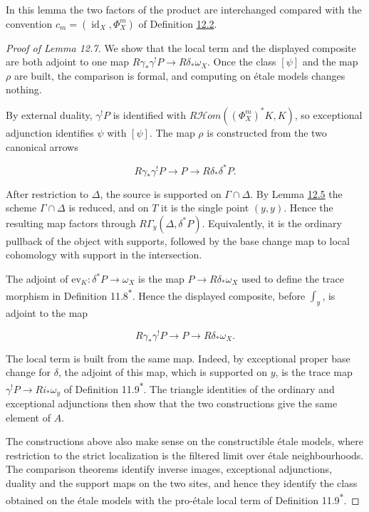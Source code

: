 \documentclass[11pt]{article}
\newcommand{\bpout}[1]{#1\textsuperscript{\hyperlink{bp-outside}{\ensuremath{\ast}}}}
\providecommand{\cHom}{}\renewcommand{\cHom}{R\mathcal{H}\!om}
\begin{document}
\label{bp22}%
In this lemma the two factors of the product are interchanged compared with the convention \(c_m=(\operatorname{id}_X,\Phi_X^m)\) of Definition \hyperref[bp7]{12.2}.

\begin{proof}[{Proof of Lemma 12.7}]\label{bp23}%
We show that the local term and the displayed composite are both adjoint to one map \(R\gamma_*\gamma^!P\to R\delta_*\omega_X\). Once the class \([\psi]\) and the map \(\rho\) are built, the comparison is formal, and computing on étale models changes nothing.

By external duality, \(\gamma^!P\) is identified with \(\cHom((\Phi_X^m)^*K,K)\), so exceptional adjunction identifies \(\psi\) with \([\psi]\). The map \(\rho\) is constructed from the two canonical arrows

\[
R\gamma_*\gamma^!P\longrightarrow P\longrightarrow R\delta_*\delta^*P.
\]

After restriction to \(\Delta\), the source is supported on \(\Gamma\cap\Delta\). By Lemma \hyperref[bp15]{12.5} the scheme \(\Gamma\cap\Delta\) is reduced, and on \(T\) it is the single point \((y,y)\). Hence the resulting map factors through \(R\Gamma_y(\Delta,\delta^*P)\). Equivalently, it is the ordinary pullback of the object with supports, followed by the base change map to local cohomology with support in the intersection.

The adjoint of \(\mathrm{ev}_K:\delta^*P\to\omega_X\) is the map \(P\to R\delta_*\omega_X\) used to define the trace morphism in Definition \bpout{11.8}. Hence the displayed composite, before \(\int_y\), is adjoint to the map

\[
R\gamma_*\gamma^!P\longrightarrow P\longrightarrow R\delta_*\omega_X.
\]

The local term is built from the same map. Indeed, by exceptional proper base change for \(\delta\), the adjoint of this map, which is supported on \(y\), is the trace map \(\gamma^!P\to Ri_*\omega_y\) of Definition \bpout{11.9}. The triangle identities of the ordinary and exceptional adjunctions then show that the two constructions give the same element of \(A\).

The constructions above also make sense on the constructible étale models, where restriction to the strict localization is the filtered limit over étale neighbourhoods. The comparison theorems identify inverse images, exceptional adjunctions, duality and the support maps on the two sites, and hence they identify the class obtained on the étale models with the pro-étale local term of Definition \bpout{11.9}.
\end{proof}
\end{document}

